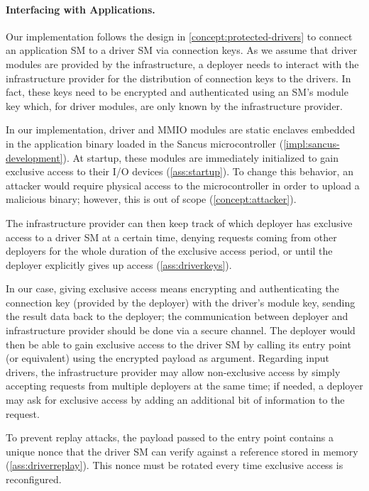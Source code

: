 \paragraph*{Interfacing with Applications.}
\label{concept:app-io-interface}

Our implementation follows the design in \cref{concept:protected-drivers} to
connect an application \ac{SM} to a driver \ac{SM} via connection keys. As we
assume that driver modules are provided by the infrastructure, a deployer needs
to interact with the infrastructure provider for the distribution of connection
keys to the drivers. In fact, these keys need to be encrypted and authenticated
using an \ac{SM}'s module key which, for driver modules, are only known by the
infrastructure provider.

In our implementation, driver and \ac{MMIO} modules are static enclaves embedded
in the application binary loaded in the Sancus microcontroller
(\cref{impl:sancus-development}). At startup, these modules are immediately
initialized to gain exclusive access to their I/O devices (\ref{ass:startup}).
To change this behavior, an attacker would require physical access to the
microcontroller in order to upload a malicious binary; however, this is out of
scope (\cref{concept:attacker}).

The infrastructure provider can then keep track of which deployer has exclusive
access to a driver \ac{SM} at a certain time, denying requests coming from other
deployers for the whole duration of the exclusive access period, or
until the deployer explicitly gives up access (\ref{ass:driverkeys}).

In our case, giving exclusive access means encrypting and
authenticating the connection key (provided by the deployer) with the driver's
module key, sending the result data back to the deployer; the communication
between deployer and infrastructure provider should be done via a secure
channel. The deployer would then be able to gain exclusive access to the driver
\ac{SM} by calling its \setkey{} entry point (or equivalent) using the encrypted
payload as argument. Regarding input drivers, the infrastructure provider may
allow non-exclusive access by simply accepting requests from multiple deployers
at the same time; if needed, a deployer may ask for exclusive access by adding
an additional bit of information to the request.

To prevent replay attacks, the payload passed to the \setkey{} entry point
contains a unique nonce that the driver \ac{SM} can verify against a
reference stored in memory (\ref{ass:driverreplay}). This nonce must be rotated
every time exclusive access is reconfigured.

